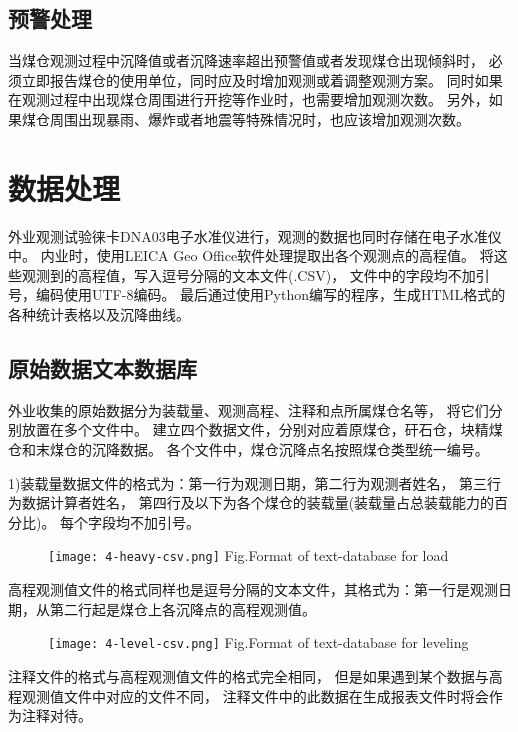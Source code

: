 \newpage
\subsection{预警处理}
当煤仓观测过程中沉降值或者沉降速率超出预警值或者发现煤仓出现倾斜时，
必须立即报告煤仓的使用单位，同时应及时增加观测或着调整观测方案。
同时如果在观测过程中出现煤仓周围进行开挖等作业时，也需要增加观测次数。
另外，如果煤仓周围出现暴雨、爆炸或者地震等特殊情况时，也应该增加观测次数。


\section{数据处理}
外业观测试验徕卡DNA03电子水准仪进行，观测的数据也同时存储在电子水准仪中。
内业时，使用LEICA Geo Office软件处理提取出各个观测点的高程值。
将这些观测到的高程值，写入逗号分隔的文本文件(.CSV)，
文件中的字段均不加引号，编码使用UTF-8编码。
最后通过使用Python编写的程序，生成HTML格式的各种统计表格以及沉降曲线。

\subsection{原始数据文本数据库}
外业收集的原始数据分为装载量、观测高程、注释和点所属煤仓名等，
将它们分别放置在多个文件中。
建立四个数据文件，分别对应着原煤仓，矸石仓，块精煤仓和末煤仓的沉降数据。
各个文件中，煤仓沉降点名按照煤仓类型统一编号。

1)装载量数据文件的格式为：第一行为观测日期，第二行为观测者姓名，
第三行为数据计算者姓名，
第四行及以下为各个煤仓的装载量(装载量占总装载能力的百分比)。
每个字段均不加引号。
\begin{figure}[!htbp]
   \centering
   \texttt{[image: 4-heavy-csv.png]}
			{Fig.}{Format of text-database for load}
\end{figure}

高程观测值文件的格式同样也是逗号分隔的文本文件，其格式为：第一行是观测日期，从第二行起是煤仓上各沉降点的高程观测值。
\begin{figure}[!htbp]
   \centering
   \texttt{[image: 4-level-csv.png]}
			{Fig.}{Format of text-database for leveling}
\end{figure}

注释文件的格式与高程观测值文件的格式完全相同，
但是如果遇到某个数据与高程观测值文件中对应的文件不同，
注释文件中的此数据在生成报表文件时将会作为注释对待。

